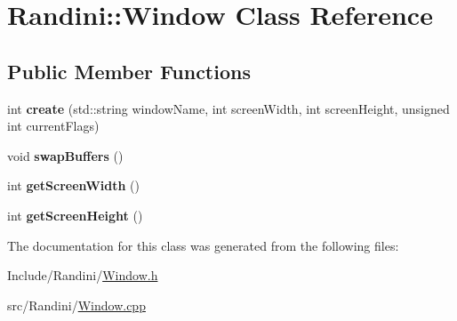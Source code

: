 \hypertarget{classRandini_1_1Window}{
\section{Randini::Window Class Reference}
\label{classRandini_1_1Window}
}
\subsection*{Public Member Functions}
\begin{DoxyCompactItemize}
\item 
\hypertarget{classRandini_1_1Window_a74f33cf737af665902138f80cc779cb5}{
int {\bfseries create} (std::string windowName, int screenWidth, int screenHeight, unsigned int currentFlags)}
\label{classRandini_1_1Window_a74f33cf737af665902138f80cc779cb5}

\item 
\hypertarget{classRandini_1_1Window_af0fe0a4f666f5c946bb8df997977e40e}{
void {\bfseries swapBuffers} ()}
\label{classRandini_1_1Window_af0fe0a4f666f5c946bb8df997977e40e}

\item 
\hypertarget{classRandini_1_1Window_a7b4ddf85609bbe27f2800ff05a0130dc}{
int {\bfseries getScreenWidth} ()}
\label{classRandini_1_1Window_a7b4ddf85609bbe27f2800ff05a0130dc}

\item 
\hypertarget{classRandini_1_1Window_aedbf196a50a63cf91c8eedcc5d80e204}{
int {\bfseries getScreenHeight} ()}
\label{classRandini_1_1Window_aedbf196a50a63cf91c8eedcc5d80e204}

\end{DoxyCompactItemize}


The documentation for this class was generated from the following files:\begin{DoxyCompactItemize}
\item 
Include/Randini/\hyperlink{Window_8h}{Window.h}\item 
src/Randini/\hyperlink{Window_8cpp}{Window.cpp}\end{DoxyCompactItemize}
